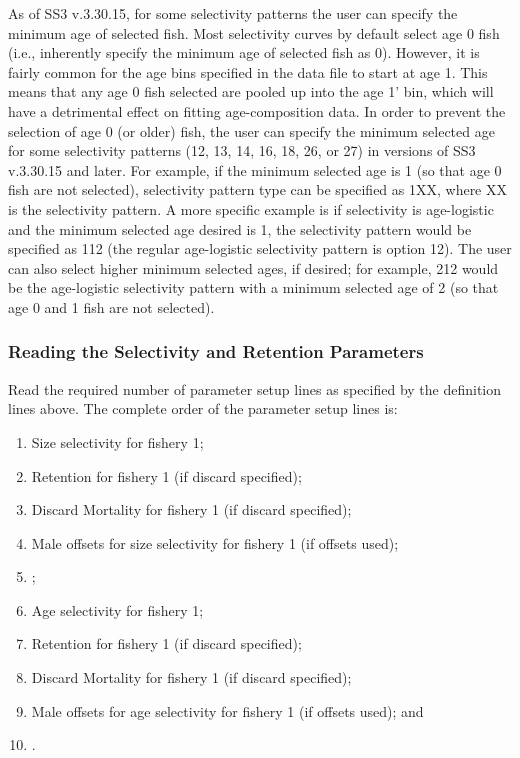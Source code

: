 As of SS3 v.3.30.15, for some selectivity patterns the user can specify the minimum age of selected fish. Most selectivity curves by default select age 0 fish (i.e., inherently specify the minimum age of selected fish as 0). However, it is fairly common for the age bins specified in the data file to start at age 1. This means that any age 0 fish selected are pooled up into the age 1' bin, which will have a detrimental effect on fitting age-composition data. In order to prevent the selection of age 0 (or older) fish, the user can specify the minimum selected age for some selectivity patterns (12, 13, 14, 16, 18, 26, or 27) in versions of SS3 v.3.30.15 and later. For example, if the minimum selected age is 1 (so that age 0 fish are not selected), selectivity pattern type can be specified as 1XX, where XX is the selectivity pattern. A more specific example is if selectivity is age-logistic and the minimum selected age desired is 1, the selectivity pattern would be specified as 112 (the regular age-logistic selectivity pattern is option 12). The user can also select higher minimum selected ages, if desired; for example, 212 would be the age-logistic selectivity pattern with a minimum selected age of 2 (so that age 0 and 1 fish are not selected).

\subsubsection{Reading the Selectivity and Retention Parameters}
Read the required number of parameter setup lines as specified by the definition lines above.  The complete order of the parameter setup lines is:
\begin{enumerate}
	\item Size selectivity for fishery 1;
	\item Retention for fishery 1 (if discard specified);
	\item Discard Mortality for fishery 1 (if discard specified);
	\item Male offsets for size selectivity for fishery 1 (if offsets used);
	\item <repeat for additional fleets and surveys>;
	\item Age selectivity for fishery 1;
	\item Retention for fishery 1 (if discard specified);
	\item Discard Mortality for fishery 1 (if discard specified);
	\item Male offsets for age selectivity for fishery 1 (if offsets used); and
	\item <repeat for additional fleets and surveys>.
\end{enumerate}


